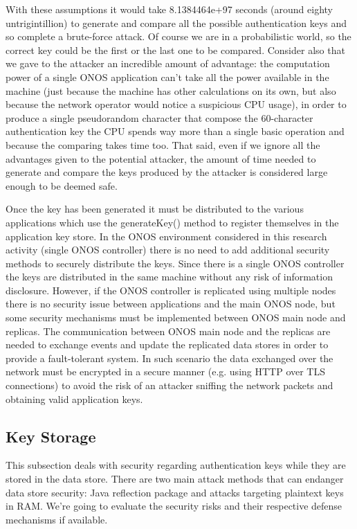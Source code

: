 With these assumptions it would take 8.1384464e+97 seconds (around eighty untrigintillion) to generate and compare all the possible authentication keys and so complete a brute-force attack. Of course we are in a probabilistic world, so the correct key could be the first or the last one to be compared. Consider also that we gave to the attacker an incredible amount of advantage: the computation power of a single ONOS application can't take all the power available in the machine (just because the machine has other calculations on its own, but also because the network operator would notice a suspicious CPU usage), in order to produce a single pseudorandom character that compose the 60-character authentication key the CPU spends way more than a single basic operation and because the comparing takes time too. That said, even if we ignore all the advantages given to the potential attacker, the amount of time needed to generate and compare the keys produced by the attacker is considered large enough to be deemed safe.
\medskip

Once the key has been generated it must be distributed to the various applications which use the generateKey() method to register themselves in the application key store. In the ONOS environment considered in this research activity (single ONOS controller) there is no need to add additional security methods to securely distribute the keys. Since there is a single ONOS controller the keys are distributed in the same machine without any risk of information disclosure. However, if the ONOS controller is replicated using multiple nodes there is no security issue between applications and the main ONOS node, but some security mechanisms must be implemented between ONOS main node and replicas. The communication between ONOS main node and the replicas are needed to exchange events and update the replicated data stores in order to provide a fault-tolerant system. In such scenario the data exchanged over the network must be encrypted in a secure manner (e.g. using HTTP over TLS connections) to avoid the risk of an attacker sniffing the network packets and obtaining valid application keys.

\subsection{Key Storage}

This subsection deals with security regarding authentication keys while they are stored in the data store. There are two main attack methods that can endanger data store security: Java reflection package and attacks targeting plaintext keys in RAM. We're going to evaluate the security risks and their respective defense mechanisms if available.

